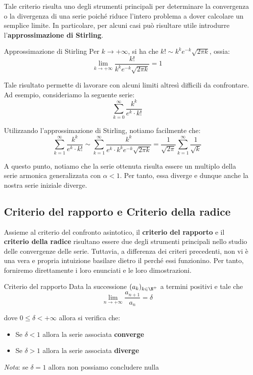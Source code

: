 \documentclass[a4paper, 12pt]{report}
\begin{document}
    Tale criterio risulta uno degli strumenti principali per determinare la convergenza o la divergenza di una serie poiché riduce l'intero problema a dover calcolare un semplice limite. In particolare, per alcuni casi può risultare utile introdurre l'\textbf{approssimazione di Stirling}.
    
    \begin{framedprop}{Approssimazione di Stirling}
        Per $k \to +\infty$, si ha che $k! \sim k^k e^{-k} \sqrt{2\pi k}$, ossia:
        \[\lim_{k \to +\infty} \frac{k!}{k^k e^{-k} \sqrt{2\pi k}} = 1\]
    \end{framedprop}
    
    Tale risultato permette di lavorare con alcuni limiti altresì difficili da confrontare. Ad esempio, consideriamo la seguente serie:
    \[\sum_{k=0}^{\infty} \frac{k^k}{e^k \cdot k!} \]

    Utilizzando l'approssimazione di Stirling, notiamo facilmente che:
    \[\sum_{k=1}^{\infty} \frac{k^k}{e^k \cdot k!} \sim \sum_{k=1}^{\infty} \frac{k^k}{e^k \cdot k^k e^{-k} \sqrt{2\pi k}} = \frac{1}{\sqrt{2\pi}}\sum_{k=1}^{\infty} \frac{1}{\sqrt{ k}} \]
    
    A questo punto, notiamo che la serie ottenuta risulta essere un multiplo della serie armonica generalizzata con $\alpha < 1$. Per tanto, essa diverge e dunque anche la nostra serie iniziale diverge.

    \newpage
    
    \subsection{Criterio del rapporto e Criterio della radice}
    
    Assieme al criterio del confronto asintotico, il \textbf{criterio del rapporto} e il \textbf{criterio della radice} risultano essere due degli strumenti principali nello studio delle convergenze delle serie. Tuttavia, a differenza dei criteri precedenti, non vi è una vera e propria intuizione basilare dietro il perché essi funzionino. Per tanto, forniremo direttamente i loro enunciati e le loro dimostrazioni.
    
    \begin{framedthm}{Criterio del rapporto}
        Data la successione $(a_k)_{k \in \N^+}$ a termini positivi e tale che
        \[ \lim_{n \to +\infty} \frac{a_{n+1}}{a_n} = \delta\]
        
        dove $0 \leq \delta < +\infty$ allora si verifica che:
        \begin{itemize}
            \item Se $\delta < 1$ allora la serie associata \textbf{converge}
            \item Se $\delta > 1$ allora la serie associata \textbf{diverge}
        \end{itemize}
        
        \textit{Nota}: se $\delta = 1$ allora non possiamo concludere nulla
    \end{framedthm}
\end{document}
